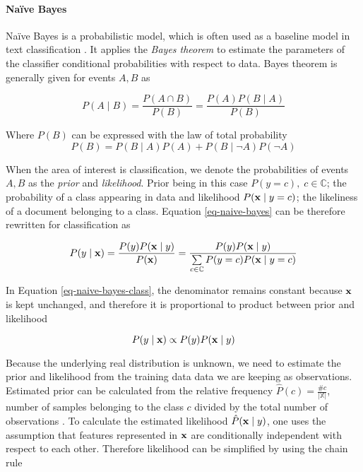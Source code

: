
\paragraph{Naïve Bayes}


Naïve Bayes is a probabilistic model, which is often used as a baseline model in text classification \cite{acemNBtc2001}. It applies the \emph{Bayes theorem} to estimate the parameters of the classifier \ie conditional probabilities with respect to data. Bayes theorem is generally given for events $A, B$ as 

\begin{equation} \label{eq-naive-bayes}
    P(A \mid B) = \dfrac{P(A \cap B)}{P(B)} = \dfrac{P(A)P(B \mid A)}{P(B)}
\end{equation}

\noindent
Where $P(B)$ can be expressed with the law of total probability
\begin{equation}
    P(B) = P(B \mid A)P(A) + P(B \mid \lnot A)P(\lnot A)
\end{equation}

When the area of interest is classification, we denote the probabilities of events $A,B$ as the \emph{prior} and \emph{likelihood}. Prior being in this case $P(y=c), \; c \in \mathbb{C}$; the probability of a class appearing in data and likelihood $P(\mathbf{x} \mid y=c)$; the likeliness of a document belonging to a class. Equation \ref{eq-naive-bayes} can be therefore rewritten for classification as \cite{Zhang04theoptimality, acemNBtc2001}

\begin{equation} \label{eq-naive-bayes-class}
    P(y \mid \mathbf{x}) = \dfrac{P(y)P(\mathbf{x} \mid y)}{P(\mathbf{x})} = \dfrac{P(y)P(\mathbf{x} \mid y)}{\sum \limits_{c \in \mathbb{C}} P(y=c)P(\mathbf{x} \mid y=c)}
\end{equation}

In Equation \ref{eq-naive-bayes-class}, the denominator remains constant because $\mathbf{x}$ is kept unchanged, and therefore it is proportional to product between prior and likelihood

\begin{equation}
    P(y \mid \mathbf{x}) \propto P(y)P(\mathbf{x} \mid y)
\end{equation}

Because the underlying real distribution is unknown, we need to estimate the prior and likelihood from the training data \ie data we are keeping as observations. Estimated prior can be calculated from the relative frequency $\hat{P}(c) = \frac{\#c}{|\mathbb{X}|}$, number of samples belonging to the class $c$ divided by the total number of observations \cite{Manning:2008:IIR:1394399}. To calculate the estimated likelihood $\hat{P}(\mathbf{x} \mid y)$, one uses the assumption that features represented in $\mathbf{x}$ are conditionally independent with respect to each other. Therefore likelihood can be simplified by using the chain rule \cite{Manning:2008:IIR:1394399}

